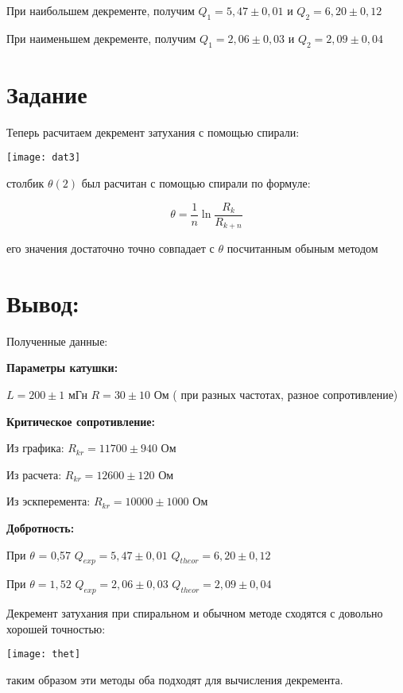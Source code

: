 \documentclass[a4paper,12pt]{article}
\begin{document}
	При наибольшем декременте, получим $Q_1 = 5,47\pm 0,01$ и $Q_2 = 6,20\pm 0,12$
	
	При наименьшем декременте, получим $Q_1 = 2,06\pm 0,03$ и $Q_2 = 2,09\pm 0,04$
	
	\section{Задание}
	
	Теперь расчитаем декремент затухания с помощью спирали:
	
	\texttt{[image: dat3]}
	
	столбик $\theta(2)$ был расчитан с помощью спирали по формуле:
	
	\begin{equation}
	\theta=\frac{1}n \ln{\frac{R_k}{R_{k+n}}}
	\end{equation}
	
	его значения достаточно точно совпадает с $\theta$ посчитанным обыным методом
	
	
	
	\section{Вывод:}
	
	Полученные данные:
	
	\textbf{Параметры катушки:}
	
	$L = 200 \pm 1$ мГн
	$R = 30 \pm 10$ Ом ( при разных частотах, разное сопротивление)
	
	\textbf{Критическое сопротивление:}
	
	Из графика:
	$R_{kr} = 11700 \pm 940$ Ом 
	
	Из расчета:
	$R_{kr} =12600 \pm 120$ Ом
	
	Из эскперемента:
	$R_{kr}= 10000 \pm 1000$ Ом
	
	
	\textbf{Добротность:}

	
	При $\theta$ = 0,57 $Q_{exp} = 5,47 \pm 0,01$ $Q_{theor} = 6,20 \pm 0,12$
	
	При $\theta = 1,52$ $Q_{exp} = 2,06 \pm 0,03$ $Q_{theor} = 2,09 \pm 0,04$
	
	Декремент затухания при спиральном и обычном методе сходятся с довольно хорошей точностью:
	
	\texttt{[image: thet]}
	
	 таким образом эти методы оба подходят для вычисления декремента.
	
\end{document}
